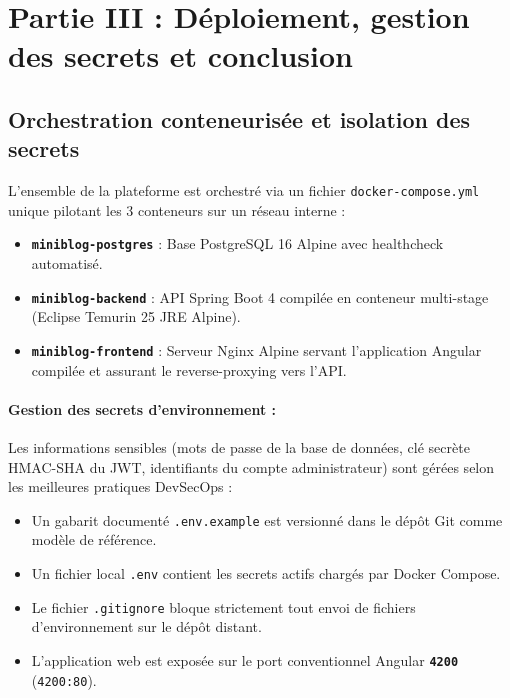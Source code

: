 \documentclass[11pt,a4paper]{article}
\begin{document}
\section{Partie III : Déploiement, gestion des secrets et conclusion}

\subsection{Orchestration conteneurisée et isolation des secrets}

L'ensemble de la plateforme est orchestré via un fichier \texttt{docker-compose.yml} unique pilotant les 3 conteneurs sur un réseau interne :
\begin{itemize}
    \item \textbf{\texttt{miniblog-postgres}} : Base PostgreSQL 16 Alpine avec healthcheck automatisé.
    \item \textbf{\texttt{miniblog-backend}} : API Spring Boot 4 compilée en conteneur multi-stage (Eclipse Temurin 25 JRE Alpine).
    \item \textbf{\texttt{miniblog-frontend}} : Serveur Nginx Alpine servant l'application Angular compilée et assurant le reverse-proxying vers l'API.
\end{itemize}

\paragraph{Gestion des secrets d'environnement :} Les informations sensibles (mots de passe de la base de données, clé secrète HMAC-SHA du JWT, identifiants du compte administrateur) sont gérées selon les meilleures pratiques DevSecOps :
\begin{itemize}
    \item Un gabarit documenté \texttt{.env.example} est versionné dans le dépôt Git comme modèle de référence.
    \item Un fichier local \texttt{.env} contient les secrets actifs chargés par Docker Compose.
    \item Le fichier \texttt{.gitignore} bloque strictement tout envoi de fichiers d'environnement sur le dépôt distant.
    \item L'application web est exposée sur le port conventionnel Angular \textbf{\texttt{4200}} (\texttt{4200:80}).
\end{itemize}
\end{document}
